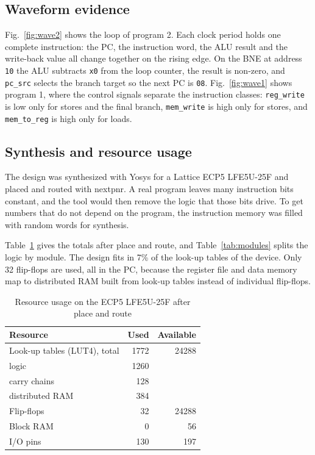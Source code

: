 \documentclass[conference]{IEEEtran}
\begin{document}
\subsection{Waveform evidence}
Fig.~\ref{fig:wave2} shows the loop of program 2. Each clock period holds one
complete instruction: the PC, the instruction word, the ALU result and the
write-back value all change together on the rising edge. On the BNE at
address \texttt{10} the ALU subtracts \texttt{x0} from the loop counter, the result
is non-zero, and \texttt{pc\_src} selects the branch target so the next PC is
\texttt{08}. Fig.~\ref{fig:wave1} shows program 1, where the control signals
separate the instruction classes: \texttt{reg\_write} is low only for stores
and the final branch, \texttt{mem\_write} is high only for stores, and
\texttt{mem\_to\_reg} is high only for loads.

\subsection{Synthesis and resource usage}
The design was synthesized with Yosys for a Lattice ECP5 LFE5U-25F and placed
and routed with nextpnr. A real program leaves many instruction bits
constant, and the tool would then remove the logic that those bits drive. To
get numbers that do not depend on the program, the instruction memory was
filled with random words for synthesis.

Table~\ref{tab:resources} gives the totals after place and route, and
Table~\ref{tab:modules} splits the logic by module. The design fits in 7\%
of the look-up tables of the device. Only 32 flip-flops are used, all in the
PC, because the register file and data memory map to distributed RAM built
from look-up tables instead of individual flip-flops.

\begin{table}[!htb]
\caption{Resource usage on the ECP5 LFE5U-25F after place and route}
\label{tab:resources}
\centering
\begin{tabular}{@{}lrr@{}}
\toprule
Resource & Used & Available \\
\midrule
Look-up tables (LUT4), total   & 1772 & 24288 \\
\quad logic                    & 1260 & \\
\quad carry chains             & 128  & \\
\quad distributed RAM          & 384  & \\
Flip-flops                     & 32   & 24288 \\
Block RAM                      & 0    & 56 \\
I/O pins                       & 130  & 197 \\
\bottomrule
\end{tabular}
\end{table}
\end{document}

